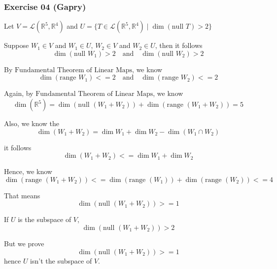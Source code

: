 \subsubsection*{Exercise 04 (Gapry)}

\begin{flushleft}

Let \( V = \mathcal{L}(\mathbb{R}^5, \mathbb{R}^4) \) and
\(
U = \{ T \in \mathcal{L}(\mathbb{R}^5, \mathbb{R}^4) \mid \dim(\text{null } T) > 2 \}
\) \newline

Suppose \( W_1 \in V \) and \( W_1 \in U \), \( W_2 \in V \) and \( W_2 \in U \), then it follows 
\[
\dim(\text{null } W_1) > 2 \quad \text{and} \quad \dim(\text{null } W_2) > 2
\]

By $\text{Fundamental Theorem of Linear Maps}$, we know 
\[
\dim(\text{range } W_1) <= 2 \quad \text{and} \quad \dim(\text{range } W_2) <= 2
\]

Again, by $\text{Fundamental Theorem of Linear Maps}$, we know 
\[
\dim(\mathbb{R}^5) = \dim(\text{null } (W_1 + W_2)) + \dim(\text{range } (W_1 + W_2)) = 5 
\]

Also, we know the 
\[
\dim(W_1 + W_2) = \dim W_1 + \dim W_2 - \dim(W_1 \cap W_2)
\]

it follows 
\[
\dim(W_1 + W_2) <= \dim W_1 + \dim W_2
\]

Hence, we know 
\[
\dim(\text{range } (W_1 + W_2)) <= \dim(\text{range } (W_1)) + \dim(\text{range } (W_2)) <= 4
\]

That means 
\[
\dim(\text{null } (W_1 + W_2)) >= 1
\]

If $U$ is the subspace of $V$, 
\[
\dim(\text{null } (W_1 + W_2)) > 2
\]

But we prove 
\[
\dim(\text{null } (W_1 + W_2)) >= 1
\]
hence $U$ isn't the subspace of $V$.

\end{flushleft}